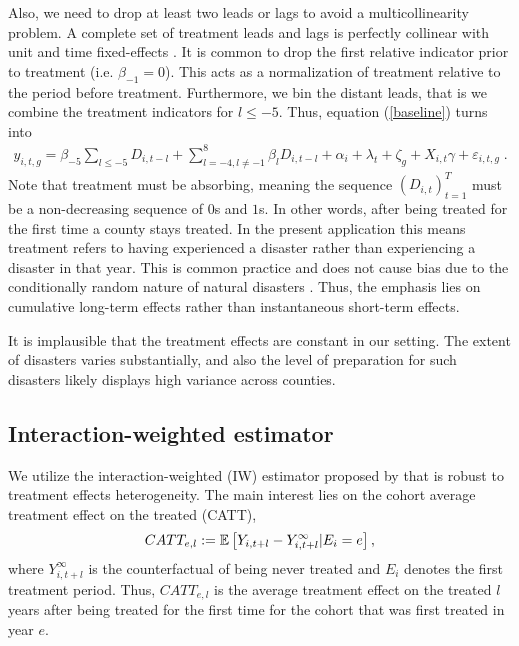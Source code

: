 Also, we need to drop at least two leads or lags to avoid a multicollinearity problem. A complete set of treatment leads and lags is perfectly collinear with unit and time fixed-effects \citep[for an extensive discussion of this issue see][section 3.2]{Borusyak_2021}. It is common to drop the first relative indicator prior to treatment (i.e. $\beta_{-1} = 0$). This acts as a normalization of treatment relative to the period before treatment. Furthermore, we bin the distant leads, that is we combine the treatment indicators for $l \leq -5$. Thus, equation (\ref{baseline}) turns into
\begin{align} \label{baselineBinned}
	y_{i, t, g} = \beta_{-5} \sum_{l \leq -5} D_{i, t-l} + \sum_{l = -4, l \neq -1}^{8} \beta_l D_{i, t-l} + \alpha_i + \lambda_t + \zeta_g + X_{i, t} \gamma + \varepsilon_{i, t, g} \;.
\end{align}
Note that treatment must be absorbing, meaning the sequence $(D_{i, t})_{t=1}^T$ must be a non-decreasing sequence of $0$s and $1$s. In other words, after being treated for the first time a county stays treated. In the present application this means treatment refers to having experienced a disaster rather than experiencing a disaster in that year. This is common practice and does not cause bias due to the conditionally random nature of natural disasters \citep{Deryugina_2017}. Thus, the emphasis lies on cumulative long-term effects rather than instantaneous short-term effects.

It is implausible that the treatment effects are constant in our setting. The extent of disasters varies substantially, and also the level of preparation for such disasters likely displays high variance across counties. 

\subsection{Interaction-weighted estimator}

We utilize the interaction-weighted (IW) estimator proposed by \cite{Sun_2021} that is robust to treatment effects heterogeneity. The main interest lies on the cohort average treatment effect on the treated (CATT),
\begin{align*}
	CATT_{e, l} := \mathbb{E} \left[ Y_{i, t+l} - Y_{i, t+l}^{\infty} | E_i = e \right],
\end{align*}
where $Y_{i, t+l}^{\infty}$ is the counterfactual of being never treated and $E_i$ denotes the first treatment period. Thus, $CATT_{e, l}$ is the average treatment effect on the treated $l$ years after being treated for the first time for the cohort that was first treated in year $e$.

